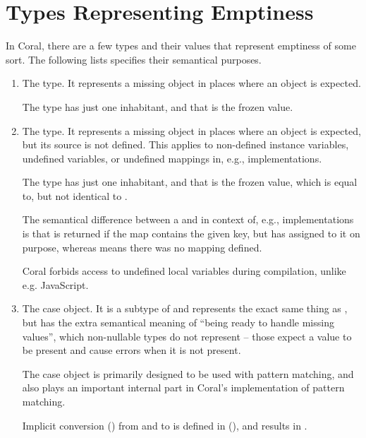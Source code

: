 \section{Types Representing Emptiness}
\label{sec:emptiness}

In Coral, there are a few types and their values that represent emptiness of some sort. The following lists specifies their semantical purposes. 

\begin{enumerate}
  \item The  type. It represents a missing object in places where an object is expected. 
  
  The type has just one inhabitant, and that is the frozen  value. 
  
  \item The  type. It represents a missing object in places where an object is expected, but its source is not defined. This applies to non-defined instance variables, undefined variables, or undefined mappings in, e.g.,  implementations. 
  
  The type has just one inhabitant, and that is the frozen  value, which is equal to, but not identical to . 
  
  The semantical difference between a  and  in context of, e.g.,  implementations is that  is returned if the map contains the given key, but has  assigned to it on purpose, whereas  means there was no mapping defined. 
  
  Coral forbids access to undefined local variables during compilation, unlike e.g. JavaScript. 
  
  \item The  case object. It is a subtype of  and represents the exact same thing as , but has the extra semantical meaning of ``being ready to handle missing values'', which non-nullable types do not represent -- those expect a value to be present and cause errors when it is not present. 
  
  The  case object is primarily designed to be used with pattern matching, and also plays an important internal part in Coral's implementation of pattern matching. 
  
  Implicit conversion () from  and  to  is defined in  (), and results in . 
  

\end{enumerate}
